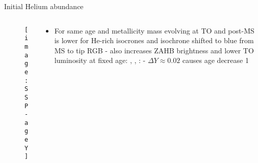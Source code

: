 \begin{frame}{Initial Helium abundance}
\begin{columns}[T]
	\begin{column}{0.45\textwidth}
		\begin{figure}[!ht]
			\texttt{[image: SSP-ageY]}\label{fig:SSP-ageY}
		\end{figure}
	\end{column}
	\begin{column}{0.45\textwidth}
		\begin{itemize}
			\item For same age and metallicity mass evolving at TO and post-MS is lower for He-rich isocrones and isochrone shifted to blue from MS to tip RGB - also increases ZAHB brightness and lower TO luminosity at fixed age: , , :  - $\Delta Y\approx 0.02$ causes age decrease \SI{1}{\giga\year}
		\end{itemize}
	\end{column}
\end{columns}
\end{frame}

